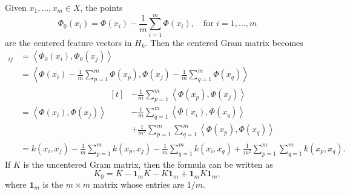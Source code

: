 Given \(x_1, \dots, x_m \in X\), the points
\begin{equation}
    \label{eqn:centered-features}
    \Phi_0(x_i) = \Phi(x_i) - \frac{1}{m} \sum_{i=1}^{m} \Phi(x_i), \quad \text{for \(i = 1,\dots,m\)}
\end{equation}
are the centered feature vectors in \(H_k\).
Then the centered Gram matrix becomes
\def\ipt#1{\left\langle #1 \right\rangle}
\begin{align*}
    [K_0]_{ij}
    &= \ipt{\Phi_0(x_i), \Phi_0(x_j)}\\
    &= \ipt{\Phi(x_i) - \frac{1}{m} \sum_{p=1}^{m} \Phi(x_p), \Phi(x_j) - \frac{1}{m} \sum_{q=1}^{m} \Phi(x_q)}\\
    &= \ipt{\Phi(x_i), \Phi(x_j)}
    \begin{aligned}[t]
        &- \frac{1}{m} \sum_{p=1}^{m} \ipt{\Phi(x_p), \Phi(x_j)}\\
        &- \frac{1}{m} \sum_{q=1}^{m} \ipt{\Phi(x_i), \Phi(x_q)}\\
        &+ \frac{1}{m^2} \sum_{p=1}^{m} \sum_{q=1}^{m} \ipt{\Phi(x_p), \Phi(x_q)}
    \end{aligned}\\
    &= k(x_i, x_j) - \frac{1}{m} \sum_{p=1}^{m} k(x_p, x_j) - \frac{1}{m} \sum_{q=1}^{m} k(x_i, x_q) + \frac{1}{m^2} \sum_{p=1}^{m} \sum_{q=1}^{m} k(x_p, x_q).
\end{align*}
If \(K\) is the uncentered Gram matrix, then the formula can be written as
\def\ones{\mathbf{1}_m}
\begin{equation}
    K_0 = K - \ones K - K \ones + \ones K \ones,
\end{equation}
where \(\ones\) is the \(m \times m\) matrix whose entries are \(1/m\).

